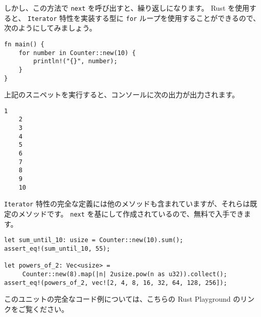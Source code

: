 しかし、この方法で \texttt{next} を呼び出すと、繰り返しになります。 Rust を使用すると、 \texttt{Iterator} 特性を実装する型に \texttt{for} ループを使用することができるので、次のようにしてみましょう。

\begin{lstlisting}[numbers=none]
fn main() {
    for number in Counter::new(10) {
        println!("{}", number);
    }
}
\end{lstlisting}

上記のスニペットを実行すると、コンソールに次の出力が出力されます。

\begin{lstlisting}[numbers=none]
    1
    2
    3
    4
    5
    6
    7
    8
    9
    10
\end{lstlisting}

\texttt{Iterator} 特性の完全な定義には他のメソッドも含まれていますが、それらは既定のメソッドです。 \texttt{next} を基にして作成されているので、無料で入手できます。

\begin{lstlisting}[numbers=none]
let sum_until_10: usize = Counter::new(10).sum();
assert_eq!(sum_until_10, 55);

let powers_of_2: Vec<usize> = 
     Counter::new(8).map(|n| 2usize.pow(n as u32)).collect();
assert_eq!(powers_of_2, vec![2, 4, 8, 16, 32, 64, 128, 256]);
\end{lstlisting}

このユニットの完全なコード例については、こちらの Rust Playground のリンクをご覧ください。
